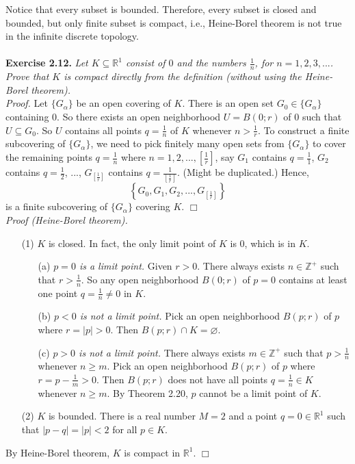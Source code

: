 \documentclass{article}
\begin{document}
Notice that every subset is bounded.
Therefore, every subset is closed and bounded,
but only finite subset is compact, i.e.,
Heine-Borel theorem is not true in the infinite discrete topology. \\\\


\textbf{Exercise 2.12.}
\emph{Let $K \subseteq \mathbb{R}^1$
consist of $0$ and the numbers $\frac{1}{n}$, for $n = 1, 2, 3, ...$.
Prove that $K$ is compact directly from the definition
(without using the Heine-Borel theorem).} \\

\emph{Proof.}
Let $\{ G_{\alpha} \}$ be an open covering of $K$.
There is an open set $G_0 \in \{ G_{\alpha} \}$ containing $0$.
So there exists an open neighborhood $U = B(0;r)$ of $0$ such that $U \subseteq G_0$.
So $U$ contains all points $q = \frac{1}{n}$ of $K$ whenever $n > \frac{1}{r}$.
To construct a finite subcovering of $\{ G_{\alpha} \}$,
we need to pick finitely many open sets from $\{ G_{\alpha} \}$
to cover the remaining points $q = \frac{1}{n}$ where $n = 1, 2, ..., \left[\frac{1}{r}\right]$,
say $G_1$ contains $q = \frac{1}{1}$, $G_2$ contains $q = \frac{1}{2}$, ...,
$G_{\left[\frac{1}{r}\right]}$ contains $q = \frac{1}{\left[\frac{1}{r}\right]}$.
(Might be duplicated.)
Hence,
$$\left\{ G_0, G_1, G_2, ..., G_{\left[\frac{1}{r}\right]} \right\}$$
is a finite subcovering of $\{ G_{\alpha} \}$ covering $K$.
$\Box$ \\

\emph{Proof (Heine-Borel theorem).}
\begin{enumerate}
\item[(1)]
$K$ is closed. In fact, the only limit point of $K$ is $0$, which is in $K$.
\begin{enumerate}
\item[(a)]
\emph{$p = 0$ is a limit point.}
Given $r > 0$.
There always exists $n \in \mathbb{Z}^{+}$ such that $r > \frac{1}{n}$.
So any open neighborhood $B(0;r)$ of $p = 0$
contains at least one point $q = \frac{1}{n} \neq 0$ in $K$.
\item[(b)]
\emph{$p < 0$ is not a limit point.}
Pick an open neighborhood $B(p;r)$ of $p$ where $r = |p| > 0$.
Then $B(p;r) \cap K = \varnothing$.
\item[(c)]
\emph{$p > 0$ is not a limit point.}
There always exists $m \in \mathbb{Z}^+$ such that $p > \frac{1}{n}$ whenever $n \geq m$.
Pick an open neighborhood $B(p;r)$ of $p$ where $r = p - \frac{1}{m} > 0$.
Then $B(p;r)$ does not have all points $q = \frac{1}{n} \in K$ whenever $n \geq m$.
By Theorem 2.20, $p$ cannot be a limit point of $K$.
\end{enumerate}
\item[(2)]
$K$ is bounded. There is a real number $M = 2$ and a point $q = 0 \in \mathbb{R}^1$
such that $|p - q| = |p| < 2$ for all $p \in K$.
\end{enumerate}
By Heine-Borel theorem, $K$ is compact in $\mathbb{R}^1$.
$\Box$ \\\\
\end{document}
